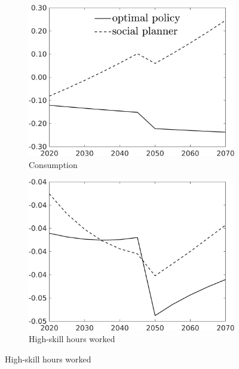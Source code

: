 \begin{figure}[h!!!]
	\centering
	\caption{Efficient and optimal allocation in deviation from laissez-faire	}\label{fig:optAll_percLf_dyn}
	\begin{subfigure}[]{0.4\textwidth}
		\caption{Consumption}
		\includegraphics[width=1\textwidth]{../../codding_model/own_basedOnFried/optimalPol_010922_revision/figures/all_13Sept22_Tplus30/C_PercentageLFDyn_Target_regime4_knspil0_spillover0_noskill0_sep0_xgrowth0_PV1_etaa0.79_lgd1.png}
	\end{subfigure}
	\begin{subfigure}[]{0.4\textwidth}
		\caption{High-skill hours worked}
		\includegraphics[width=1\textwidth]{../../codding_model/own_basedOnFried/optimalPol_010922_revision/figures/all_13Sept22_Tplus30/hh_PercentageLFDyn_Target_regime4_knspil0_spillover0_noskill0_sep0_xgrowth0_PV1_etaa0.79_lgd0.png}

\end{subfigure}
\end{figure}
